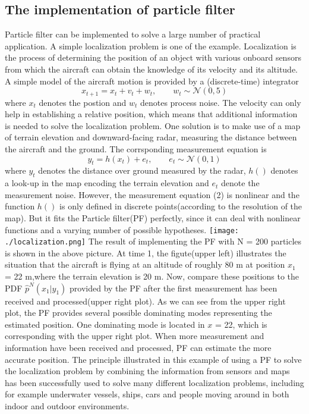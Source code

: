 \documentclass[11pt,oneside,a4paper]{article}
\begin{document}
\subsection{The implementation of particle filter}
Particle filter can be implemented to solve a large number of practical application. A simple localization problem
is one of the example. Localization is the process of determining the position of an object with various onboard
sensors from which the aircraft can obtain the knowledge of its velocity and its altitude. A simple model of the aircraft
motion is provided by a (discrete-time) integrator
\begin{equation}
x_{t+1} = x_t + v_t + w_t,\qquad w_t \sim \mathcal{N}(0,5)
\end{equation}
where $x_t$ denotes the postion and $w_t$ denotes process noise.
The velocity can only help in establishing a relative position, which
means that additional information is needed to solve the localization
problem. One solution is to make use of a map of terrain
elevation and downward-facing radar, measuring the distance between the aircraft
and the ground. The corrsponding measurement equation is
\begin{equation}
y_t = h(x_t) + e_t,\qquad e_t \sim \mathcal{N} (0,1)
\end{equation}
where $y_t$ denotes the distance over ground measured by the radar, $h()$ denotes
a look-up in the map encoding the terrain elevation and $e_t$ denote the measurement
noise. However, the measurement equation (2) is nonlinear and the function $h()$ is only
defined in discrete points(according to the resolution of the map). But it fits the
Particle filter(PF) perfectly, since it can deal with nonlinear functions and a varying
number of possible hypotheses.
\texttt{[image: ./localization.png]}
The result of implementing the PF with N = 200 particles is shown in the above picture.
At time 1, the figute(upper left) illustrates the situation that the aircraft is flying at an altitude of
roughly 80 m at position $x_1$ = 22 m,where the terrain elevation is 20 m.
Now, compare these positions to the PDF $\hat{p}^N(x_1|y_1)$ provided by the PF after the first measurement has been received and processed(upper right plot).
As we can see from the upper right plot, the PF provides several possible dominating modes representing the estimated position.
One dominating mode is located in $x$ = 22, which is corresponding with the upper right plot. When more measurement and information have
been received and processed, PF can estimate the more accurate position. The principle illustrated in this example of using a PF to solve the
localization problem by combining the information from sensors and maps has been successfully used to solve many different localization problems, including
for example underwater vessels, ships, cars and people moving around in both indoor and outdoor environments.\\
\end{document}
